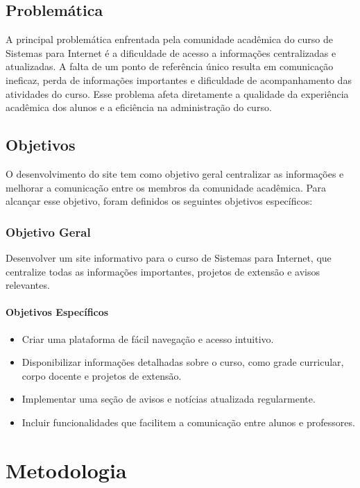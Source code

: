 \documentclass[a4paper,12pt]{report}
\begin{document}
\section{Problemática}
A principal problemática enfrentada pela comunidade acadêmica do curso de Sistemas para Internet é a dificuldade de acesso a informações centralizadas e atualizadas. A falta de um ponto de referência único resulta em comunicação ineficaz, perda de informações importantes e dificuldade de acompanhamento das atividades do curso. Esse problema afeta diretamente a qualidade da experiência acadêmica dos alunos e a eficiência na administração do curso.

\section{Objetivos}
O desenvolvimento do site tem como objetivo geral centralizar as informações e melhorar a comunicação entre os membros da comunidade acadêmica. Para alcançar esse objetivo, foram definidos os seguintes objetivos específicos:

\subsection{Objetivo Geral}
Desenvolver um site informativo para o curso de Sistemas para Internet, que centralize todas as informações importantes, projetos de extensão e avisos relevantes. 

\subsubsection{Objetivos Específicos}
\begin{itemize}
    \item Criar uma plataforma de fácil navegação e acesso intuitivo.
    \item Disponibilizar informações detalhadas sobre o curso, como grade curricular, corpo docente e projetos de extensão.
    \item Implementar uma seção de avisos e notícias atualizada regularmente.
    \item Incluir funcionalidades que facilitem a comunicação entre alunos e professores.
\end{itemize}

\chapter{Metodologia}
\end{document}
